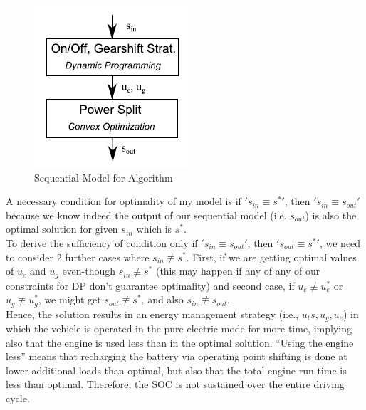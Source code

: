 \documentclass[conference]{IEEEtran}
\begin{document}
\begin{figure}[h]
    \centering
    \includegraphics[]{Sequential.png}
    \caption{Sequential Model for Algorithm}
    \label{fig:seq}
\end{figure}

A necessary condition for optimality of my model is if $'s_{in} \equiv s^{*}'$, then $'s_{in} \equiv s_{out} '$ because we know indeed the output of our sequential model (i.e. $s_{out}$) is also the optimal solution for given $s_{in}$ which is $s^{*}$.\\
To derive the sufficiency of condition only if $'s_{in} \equiv s_{out}'$, then $'s_{out} \equiv s^*'$, we need to consider 2 further cases where $s_{in} \not\equiv s^*$. First, if we are getting optimal values of $u_e$ and $u_g$ even-though $s_{in} \not\equiv s^*$ (this may happen if any of any of our constraints for DP don't guarantee optimality) and second case, if $u_e \not\equiv u_e^*$ or $u_g \not\equiv u_g^*$, we might get $s_{out} \not\equiv s^*$, and also $s_{in} \not\equiv s_{out}$. \\

Hence, the solution results in an energy management strategy (i.e., $u_ts, u_g, u_e$) in which the vehicle is operated in the pure electric mode for more time, implying also that the engine is used less than in the optimal solution. “Using the engine less” means that recharging the battery via operating point shifting is done at
lower additional loads than optimal, but also that the total engine run-time is less than optimal. Therefore, the SOC is not sustained over the entire driving cycle.
\end{document}
